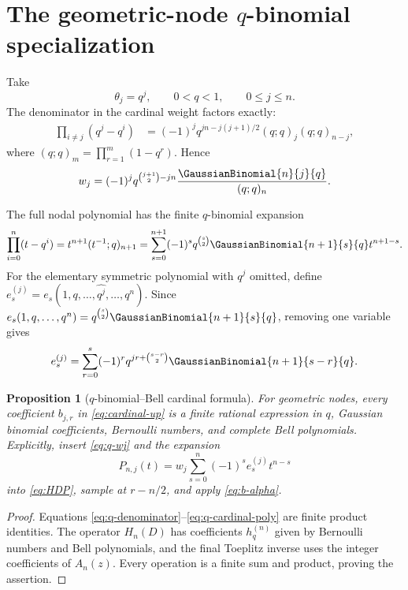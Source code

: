 \documentclass[11pt,oneside]{article}
\newtheorem{proposition}[theorem]{Proposition}
\theoremstyle{definition}
\theoremstyle{remark}
\newcommand{\1}{\mathbf{1}}
\begin{document}
\section{The geometric-node \texorpdfstring{$q$}{q}-binomial specialization}
\label{sec:q-specialization}

Take
\[
 \theta_j=q^j,\qquad 0<q<1,
 \qquad 0\le j\le n.
\]
The denominator in the cardinal weight factors exactly:
\begin{align}
 \prod_{i\ne j}(q^j-q^i)
 &=(-1)^j q^{jn-j(j+1)/2}(q;q)_j(q;q)_{n-j},
 \label{eq:q-denominator}
\end{align}
where $(q;q)_m=\prod_{r=1}^m(1-q^r)$.  Hence
\begin{equation}
 w_j=(-1)^j q^{\binom{j+1}{2}-jn}
 \frac{\GaussianBinomial{n}{j}{q}}{(q;q)_n}.
 \label{eq:q-wj}
\end{equation}

The full nodal polynomial has the finite $q$-binomial expansion \cite{PrimaryRepo}
\begin{equation}
 \prod_{i=0}^n(t-q^i)
 =t^{n+1}(t^{-1};q)_{n+1}
 =\sum_{s=0}^{n+1}(-1)^s q^{\binom{s}{2}}
 \GaussianBinomial{n+1}{s}{q}t^{n+1-s}.
 \label{eq:q-nodal}
\end{equation}
For the elementary symmetric polynomial with $q^j$ omitted, define
$e_s^{(j)}=e_s(1,q,\ldots,\widehat{q^j},\ldots,q^n)$.  Since
$e_s(1,q,\ldots,q^n)=q^{\binom{s}{2}}\GaussianBinomial{n+1}{s}{q}$,
removing one variable gives
\begin{equation}
 e_s^{(j)}=\sum_{r=0}^s(-1)^r q^{jr+\binom{s-r}{2}}
 \GaussianBinomial{n+1}{s-r}{q}.
 \label{eq:q-excluded-e}
\end{equation}

\begin{proposition}[$q$-binomial--Bell cardinal formula]
\label{prop:q-bell}
For geometric nodes, every coefficient $b_{j,r}$ in
\eqref{eq:cardinal-up} is a finite rational expression in
$q$, Gaussian binomial coefficients, Bernoulli numbers, and complete Bell
polynomials.  Explicitly, insert \eqref{eq:q-wj} and the expansion
\begin{equation}
 P_{n,j}(t)=w_j\sum_{s=0}^n(-1)^se_s^{(j)}t^{n-s}
 \label{eq:q-cardinal-poly}
\end{equation}
into \eqref{eq:HDP}, sample at $r-n/2$, and apply
\eqref{eq:b-alpha}.
\end{proposition}

\begin{proof}
Equations \eqref{eq:q-denominator}--\eqref{eq:q-cardinal-poly} are finite
product identities.  The operator $H_n(D)$ has coefficients
$h_q^{(n)}$ given by Bernoulli numbers and Bell polynomials, and the final
Toeplitz inverse uses the integer coefficients of $A_n(z)$.  Every operation
is a finite sum and product, proving the assertion.
\end{proof}
\end{document}
